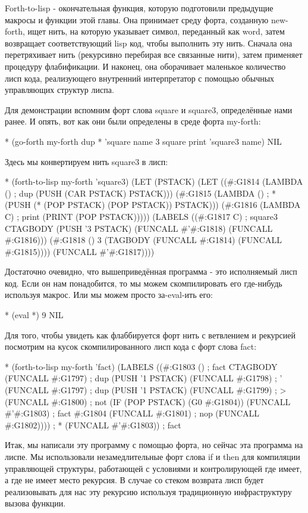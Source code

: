 {{{Forth-to-lisp - окончательная функция, которую подготовили предыдущие макросы и функции этой главы. Она принимает среду форта, созданную new-forth, ищет нить, на которую указывает символ, переданный как word, затем возвращает соответствующий lisp код, чтобы выполнить эту нить. Сначала она перетряхивает нить (рекурсивно перебирая все связанные нити), затем применяет процедуру флабификации. И наконец, она оборачивает маленькое количество лисп кода, реализующего внутренний интерпретатор с помощью обычных управляющих структур лиспа.

Для демонстрации вспомним форт слова square и square3, определённые нами ранее. И опять, вот как они были определены в среде форта my-forth:

* (go-forth my-forth
{ dup * } ’square name
{ 3 square print } ’square3 name)
NIL

Здесь мы конвертируем нить square3 в лисп:

* (forth-to-lisp my-forth ’square3)
(LET (PSTACK)
(LET ((#:G1814 (LAMBDA () ; dup
(PUSH (CAR PSTACK) PSTACK)))
(#:G1815 (LAMBDA () ; *
(PUSH (* (POP PSTACK)
(POP PSTACK))
PSTACK)))
(#:G1816 (LAMBDA C) ; print
(PRINT (POP PSTACK)))))
(LABELS ((#:G1817 C) ; square3
CTAGBODY
(PUSH '3 PSTACK)
(FUNCALL #’#:G1818)
(FUNCALL #:G1816)))
(#:G1818 () 3 %
(TAGBODY
(FUNCALL #:G1814)
(FUNCALL #:G1815))))
(FUNCALL #’#:G1817))))

Достаточно очевидно, что вышеприведённая программа - это исполняемый лисп код. Если он нам понадобится, то мы можем скомпилировать его где-нибудь используя макрос. Или мы можем просто за-eval-ить его:

* (eval *)
9
NIL

Для того, чтобы увидеть как флаббируется форт нить с ветвлением и рекурсией посмотрим на кусок скомпилированного лисп кода с форт слова fact:

* (forth-to-lisp my-forth ’fact)
(LABELS ((#:G1803 () ; fact
CTAGBODY
(FUNCALL #:G1797) ; dup
(PUSH ’1 PSTACK)
(FUNCALL #:G1798) ; '
(FUNCALL #:G1797) ; dup
(PUSH '1 PSTACK)
(FUNCALL #:G1799) ; >
(FUNCALL #:G1800) ; not
(IF (POP PSTACK) (G0 #:G1804))
(FUNCALL #’#:G1803) ; fact
#:G1804
(FUNCALL #:G1801) ; nop
(FUNCALL #:G1802)))) ; *
(FUNCALL #’#:G1803)) ; fact

Итак, мы написали эту программу с помощью форта, но сейчас эта программа на лиспе. Мы использовали незамедлительные форт слова if и then для компиляции управляющей структуры, работающей с условиями и контролирующей где имеет, а где не имеет место рекурсия. В случае со стеком возврата лисп будет реализовывать для нас эту рекурсию используя традиционную инфраструктуру вызова функции.

}}}
